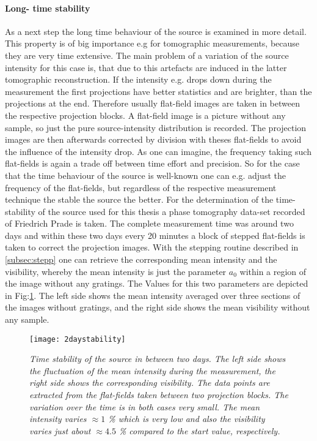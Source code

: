 \paragraph{Long- time stability}
As a next step the long time behaviour of the source is examined in more detail. This property is of big importance e.g for tomographic measurements, because they are very time extensive. The main problem of a variation of the source intensity for this case is, that due to this artefacts are induced in the latter tomographic reconstruction. If the intensity e.g. drops down during the measurement the first projections have better statistics and are brighter, than the projections at the end. Therefore usually flat-field images are taken in between the respective projection blocks. A flat-field image is a picture without any sample, so just the pure source-intensity distribution is recorded. The projection images are then afterwards corrected by division with theses flat-fields to avoid the influence of the intensity drop. As one can imagine, the frequency taking such flat-fields is again a trade off between time effort and precision. So for the case that the time behaviour of the source is well-known one can e.g. adjust the frequency of the flat-fields, but regardless of the respective measurement technique the stable the source the better. For the determination of the time-stability of the source used for this thesis a phase tomography data-set recorded of Friedrich Prade is taken. The complete measurement time was around two days and within these two days every 20 minutes a block of stepped flat-fields is taken to correct the projection images. With the stepping routine described in \ref{subsec:stepp} one can retrieve the corresponding mean intensity and the visibility, whereby the mean intensity is just the parameter $a_{0}$ within a region of the image without any gratings. The Values for this two parameters are depicted in Fig:\ref{2daysstabi}. The left side shows the mean intensity averaged over three sections of the images without gratings, and the right side shows the mean visibility without any sample.       
\begin{figure}[t]
	\begin{center}
		\texttt{[image: 2daystability]}
	\end{center}
	\caption[Time-stability of the source during two days]{\textit{Time stability of the source in between two days. The left side shows the fluctuation of the mean intensity during the measurement, the right side shows the corresponding visibility. The data points are extracted from the flat-fields taken between two projection blocks. The variation over the time is in both cases very small. The mean intensity varies $\approx1$ \% which is very low and also the visibility varies just about $\approx 4.5$ \% compared to the start value, respectively.}}
	\label{2daysstabi}
\end{figure}
